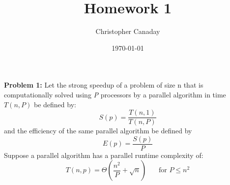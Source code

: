 \documentclass{article}
\title{Homework 1}
\author{Christopher Canaday}
\date{\today}
\begin{document}
    \maketitle
    \textbf{Problem 1:} Let the strong speedup of a problem of size n that is computationally solved using \textit{P} processors
by a parallel algorithm in time $T(n, P)$ be defined by:
    \begin{equation}
        S(p) = \frac{T(n,1)}{T(n,P)}
    \end{equation}
    and the efficiency of the same parallel algorithm be defined by
    \begin{equation}
        E(p) = \frac{S(p)}{P}
    \end{equation}
    Suppose a parallel algorithm has a parallel runtime complexity of:
    \begin{equation}
        T(n,p) = \Theta(\frac{n^2}{P} + \sqrt{n}) \phantom{text}\text{for } P \leq n^2
    \end{equation}
\end{document}
